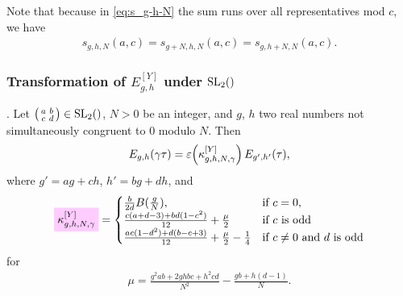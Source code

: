 \documentclass{article}
\begin{document}
Note that because in \eqref{eq:s_g-h-N} the sum runs over all
representatives mod $c$, we have
\begin{gather*}
  s_{g,h,N}(a,c)=s_{g+N,h,N}(a,c)=s_{g,h+N,N}(a,c).
\end{gather*}



\subsubsection{Transformation of $E_{g,h}^{[Y]}$ under $\SL2Z$}

\begin{Lemma}[Yang]
  \cite[Theorem~1]{Yang_GeneralizedDedekindEtaFunctions_2004}.
  \label{thm:Generalized-Eta-Transformation-Yang}
  Let
  $\left(\begin{smallmatrix}a&b\\c&d\end{smallmatrix}\right) \in
  \SL2Z$, $N>0$ be an integer, and $g$, $h$ two real numbers not
  simultaneously congruent to 0 modulo $N$.
  Then
  \begin{gather*}
    E_{g,h}(\gamma\tau)
    =
    \varepsilon\!\left(\kappa_{g,h,N,\gamma}^{[Y]}\right)E_{g',h'}(\tau),
  \end{gather*}
  where $g'=ag+ch$, $h'=bg+dh$, and
  \begin{gather}
    \defineNotation[kappa-g-h-N-gamma-Yang]{\kappa_{g,h,N,\gamma}^{[Y]}}
    =
    \begin{cases}
      \frac{b}{2d} B(\frac{g}{N}), &\text{if $c=0$},
      \\
      \frac{c (a+d-3) + b d (1 - c^2)}{12} + \frac{\mu}{2}
      &
      \text{if $c$ is odd}
      \\
      \frac{a c (1 - d^2) + d (b - c + 3)}{12} + \frac{\mu}{2} - \frac{1}{4}
      &
      \text{if $c\not=0$ and $d$ is odd}
    \end{cases}
    \label{eq:kappa_g-h-N-gamma-Yang}
  \end{gather}
  for
  \begin{gather}
    \mu = \frac{g^2 a b + 2 g h b c + h^2 c d}{N^2}
             - \frac{g b + h (d-1)}{N}.
  \end{gather}
\end{Lemma}
\end{document}
